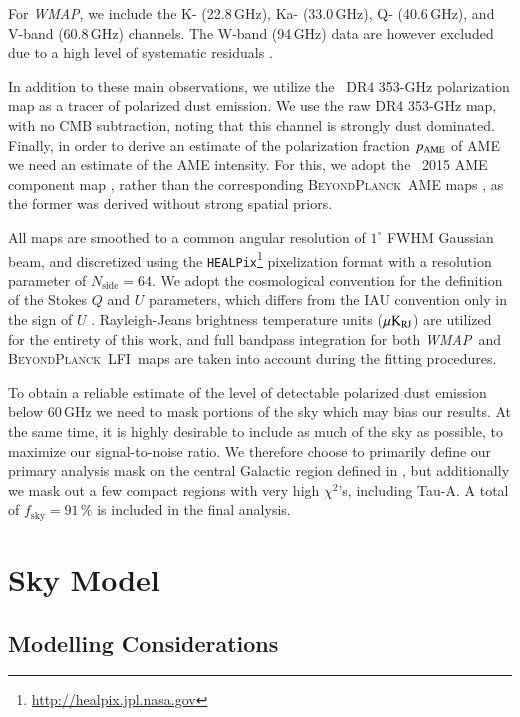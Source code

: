 \documentclass[twocolumn]{aa}
\def\WMAP{\textit{WMAP}}
\def\nside{N_{\mathrm{side}}}
\def\healpix{\texttt{HEALPix}}
\newcommand{\BP}{\textsc{BeyondPlanck}}
\newcommand{\lfi}[0]{LFI}
\begin{document}
For \WMAP, we include the K- (22.8\,GHz), Ka- (33.0\,GHz), Q- (40.6\,GHz), and V-band (60.8\,GHz) channels. The W-band (94\,GHz) data are however excluded due to a high level of systematic residuals \citep{bennett2012}.

In addition to these main observations, we utilize the \Planck\ DR4 353-GHz polarization map \citep{planck2020-LVII} as a tracer of polarized dust emission. We use the raw DR4 353-GHz map, with no CMB subtraction, noting that this channel is strongly dust dominated. Finally, in order to derive an estimate of the polarization fraction $p_{\rm AME}$ of AME we need an estimate of the AME intensity. For this, we adopt the \Planck\ 2015 AME component map \citep{planck2014-a12}, rather than the corresponding \BP\ AME maps \citep{BP13}, as the former was derived without strong spatial priors.

All maps are smoothed to a common angular resolution of $1^{\circ}$ FWHM Gaussian beam, and discretized using the \healpix\footnote{\url{http://healpix.jpl.nasa.gov}} pixelization format \citep{gorski2005} with a resolution parameter of ${\nside = 64}$. We adopt the cosmological convention for the definition of the Stokes $Q$ and $U$ parameters, which differs from the IAU convention only in the sign of $U$ \citep{gorski2005}. Rayleigh-Jeans brightness temperature units ($\mu {\rm K_{RJ}}$) are utilized for the entirety of this work, and full bandpass integration for both \WMAP\ and \BP\ \lfi\ maps are taken into account during the fitting procedures.

To obtain a reliable estimate of the level of detectable polarized dust emission below 60\,GHz we need to mask portions of the sky which may bias our results. At the same time, it is highly desirable to include as much of the sky as possible, to maximize our signal-to-noise ratio. We therefore choose to primarily define our primary analysis mask on the central Galactic region defined in \citet{bp14}, but additionally we mask out a few compact regions with very high $\chi^2$'s, including Tau-A. A total of $f_{\mathrm{sky}}=91\,\%$ is included in the final analysis.

\section{Sky Model}
\label{sec:sky_model}

\subsection{Modelling Considerations}
\end{document}

